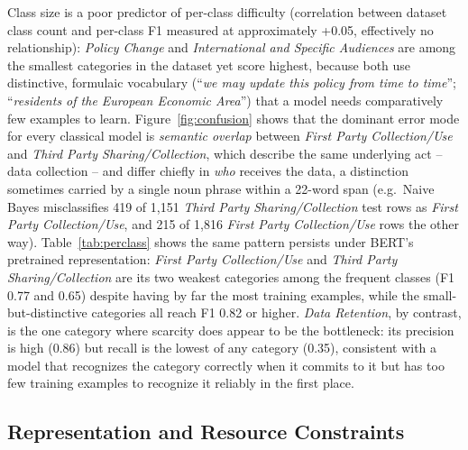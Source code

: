 \documentclass[11pt]{acl}
\begin{document}
Class size is a poor predictor of per-class difficulty (correlation between dataset
class count and per-class F1 measured at approximately +0.05, effectively no
relationship): \emph{Policy Change} and \emph{International and Specific Audiences} are
among the smallest categories in the dataset yet score highest, because both use
distinctive, formulaic vocabulary (``\emph{we may update this policy from time to
time}''; ``\emph{residents of the European Economic Area}'') that a model needs
comparatively few examples to learn. Figure~\ref{fig:confusion} shows that the dominant
error mode for every classical model is \emph{semantic overlap} between \emph{First
Party Collection/Use} and \emph{Third Party Sharing/Collection}, which describe the same
underlying act -- data collection -- and differ chiefly in \emph{who} receives the data,
a distinction sometimes carried by a single noun phrase within a 22-word span (e.g.\
Naive Bayes misclassifies 419 of 1{,}151 \emph{Third Party Sharing/Collection} test rows
as \emph{First Party Collection/Use}, and 215 of 1{,}816 \emph{First Party
Collection/Use} rows the other way). Table~\ref{tab:perclass} shows the same
pattern persists under BERT's pretrained representation: \emph{First Party
Collection/Use} and \emph{Third Party Sharing/Collection} are its two weakest categories
among the frequent classes (F1 0.77 and 0.65) despite having by far the most training
examples, while the small-but-distinctive categories all reach F1 0.82 or higher. \emph{Data
Retention}, by contrast, is the one category where scarcity does appear to be the
bottleneck: its precision is high (0.86) but recall is the lowest of any category
(0.35), consistent with a model that recognizes the category correctly when it commits
to it but has too few training examples to recognize it reliably in the first place.

\subsection{Representation and Resource Constraints}
\label{sec:constraints}

\end{document}
